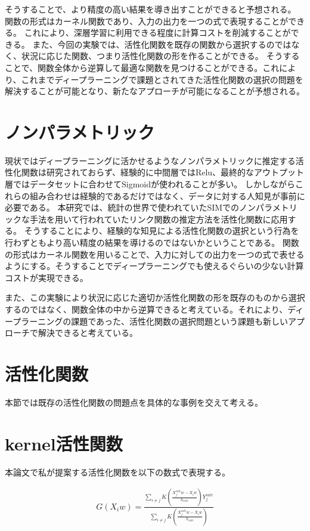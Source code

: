 そうすることで、より精度の高い結果を導き出すことができると予想される。
関数の形式はカーネル関数であり、入力の出力を一つの式で表現することができる。
これにより、深層学習に利用できる程度に計算コストを削減することができる。
また、今回の実験では、活性化関数を既存の関数から選択するのではなく、状況に応じた関数、つまり活性化関数の形を作ることができる。
そうすることで、関数全体から逆算して最適な関数を見つけることができる。これにより、これまでディープラーニングで課題とされてきた活性化関数の選択の問題を解決することが可能となり、新たなアプローチが可能になることが予想される。


\section{ノンパラメトリック}


現状ではディープラーニングに活かせるようなノンパラメトリックに推定する活性化関数は研究されておらず、経験的に中間層ではRelu、最終的なアウトプット層ではデータセットに合わせてSigmoidが使われることが多い。
しかしながらこれらの組み合わせは経験的であるだけではなく、データに対する人知見が事前に必要である。
本研究では、統計の世界で使われていたSIMでのノンパラメトリックな手法を用いて行われていたリンク関数の推定方法を活性化関数に応用する。
そうすることにより、経験的な知見による活性化関数の選択という行為を行わずともより高い精度の結果を導けるのではないかということである。
関数の形式はカーネル関数を用いることで、入力に対しての出力を一つの式で表せるようにする。そうすることでディープラーニングでも使えるぐらいの少ない計算コストが実現できる。


また、この実験により状況に応じた適切か活性化関数の形を既存のものから選択するのではなく、関数全体の中から逆算できると考えている。それにより、ディープラーニングの課題であった、活性化関数の選択問題という課題も新しいアプローチで解決できると考えている。


\section{活性化関数}
本節では既存の活性化関数の問題点を具体的な事例を交えて考える。


\section{kernel活性関数}



本論文で私が提案する活性化関数を以下の数式で表現する。


\begin{eqnarray}
G(X_iw)=\frac{\sum_{i\neq j} K\left(\frac{X^{calc}_j w - X_i w}{h_{calc}}\right)Y^{calc}_j}{\sum_{i\neq j} K\left(\frac{X^{calc}_j w - X_i w}{h_{calc}}\right)}
\end{eqnarray}

